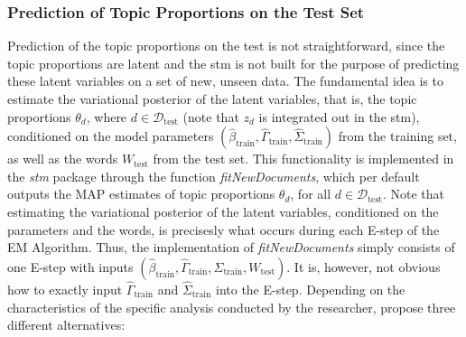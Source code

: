 \subsubsection{Prediction of Topic Proportions on the Test Set}

Prediction of the topic proportions on the test is not straightforward, since the topic proportions are latent and the stm is not built for the purpose of predicting these latent variables on a set of new, unseen data. The fundamental idea is to estimate the variational posterior of the latent variables, that is, the topic proportions $\theta_d$, where $d \in \mathcal{D}_{\text{test}}$ (note that $z_d$ is integrated out in the stm), conditioned on the model parameters $(\hat{\beta}_{\text{train}}, \hat{\Gamma}_{\text{train}}, \hat{\Sigma}_{\text{train}})$ from the training set, as well as the words $W_{\text{test}}$ from the test set. This functionality is implemented in the \textit{stm} package through the function \textit{fitNewDocuments}, which per default outputs the MAP estimates of topic proportions $\theta_d$, for all $d \in \mathcal{D}_{\text{test}}$. Note that estimating the variational posterior of the latent variables, conditioned on the parameters and the words, is precisesly what occurs during each E-step of the EM Algorithm. Thus, the implementation of \textit{fitNewDocuments} simply consists of one E-step with inputs $(\hat{\beta}_{\text{train}}, \hat{\Gamma}_{\text{train}}, \hat{\Sigma}_{\text{train}}, W_{\text{test}})$. It is, however, not obvious how to exactly input $\hat{\Gamma}_{\text{train}}$ and  $\hat{\Sigma}_{\text{train}}$ into the E-step. Depending on the characteristics of the specific analysis conducted by the researcher, \cite{egami2018make} propose three different alternatives:
